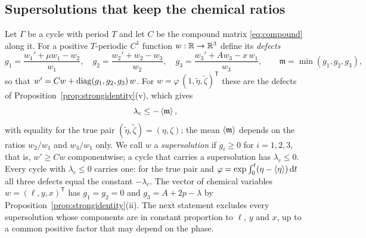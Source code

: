 \subsection{Supersolutions that keep the chemical ratios}\label{neg:sec:monomial}
Let $\Gamma$ be a cycle with period $T$ and let $C$ be the compound matrix \eqref{eq:compound} along it. For a positive $T$-periodic $C^1$ function $w:\mathbb R\to\mathbb R^3$ define its \emph{defects}
\begin{equation}\label{neg:eq:defects}
g_1=\frac{w_1'+\mu w_1-w_2}{w_1},\quad
g_2=\frac{w_2'+w_2-w_3}{w_2},\quad
g_3=\frac{w_3'+Aw_3-x\,w_1}{w_3},\qquad \mathfrak m=\min(g_1,g_2,g_3),
\end{equation}
so that $w'=Cw+\operatorname{diag}(g_1,g_2,g_3)\,w$. For $w=\varphi\,(1,\tilde\eta,\tilde\zeta)^{\mathsf T}$ these are the defects of Proposition~\ref{prop:strongidentity}(v), which gives
\begin{equation}\label{neg:eq:comparison}
\lambda_c\le-\left\langle \mathfrak m\right\rangle,
\end{equation}
with equality for the true pair $(\tilde\eta,\tilde\zeta)=(\eta,\zeta)$; the mean $\left\langle \mathfrak m\right\rangle$ depends on the ratios $w_2/w_1$ and $w_3/w_1$ only. We call $w$ a \emph{supersolution} if $g_i\ge0$ for $i=1,2,3$, that is, $w'\ge Cw$ componentwise; a cycle that carries a supersolution has $\lambda_c\le0$. Every cycle with $\lambda_c\le0$ carries one: for the true pair and $\varphi=\exp\int_0^t(\eta-\left\langle \eta\right\rangle)\,\mathrm dt$ all three defects equal the constant $-\lambda_c$. The vector of chemical variables $w=(\ell,y,x)^{\mathsf T}$ has $g_1=g_2=0$ and $g_3=A+2p-\lambda$ by Proposition~\ref{prop:strongidentity}(ii). The next statement excludes every supersolution whose components are in constant proportion to $\ell$, $y$ and $x$, up to a common positive factor that may depend on the phase.

